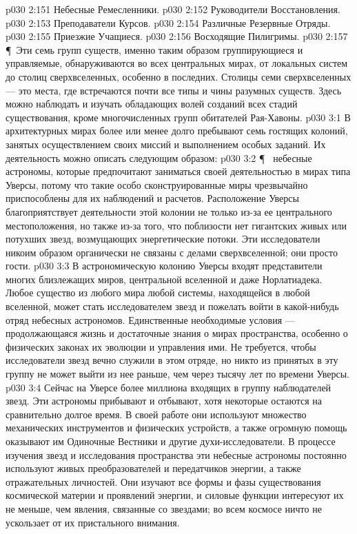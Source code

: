 \vs p030 2:151 \bibnobreakspace Небесные Ремесленники.
\vs p030 2:152 \bibnobreakspace Руководители Восстановления.
\vs p030 2:153 \bibnobreakspace Преподаватели Курсов.
\vs p030 2:154 \bibnobreakspace Различные Резервные Отряды.
\vs p030 2:155 \bibnobreakspace Приезжие Учащиеся.
\vs p030 2:156 \bibnobreakspace Восходящие Пилигримы.
\vs p030 2:157 \P\ Эти семь групп существ, именно таким образом группирующиеся и управляемые, обнаруживаются во всех центральных мирах, от локальных систем до столиц сверхвселенных, особенно в последних. Столицы семи сверхвселенных --- это места, где встречаются почти все типы и чины разумных существ. Здесь можно наблюдать и изучать обладающих волей созданий всех стадий существования, кроме многочисленных групп обитателей Рая\hyp{}Хавоны.
\vs p030 3:1 В архитектурных мирах более или менее долго пребывают семь гостящих колоний, занятых осуществлением своих миссий и выполнением особых заданий. Их деятельность можно описать следующим образом:
\vs p030 3:2 \P\ \bibnobreakspace {} небесные астрономы, которые предпочитают заниматься своей деятельностью в мирах типа Уверсы, потому что такие особо сконструированные миры чрезвычайно приспособлены для их наблюдений и расчетов. Расположение Уверсы благоприятствует деятельности этой колонии не только из\hyp{}за ее центрального местоположения, но также из\hyp{}за того, что поблизости нет гигантских живых или потухших звезд, возмущающих энергетические потоки. Эти исследователи никоим образом органически не связаны с делами сверхвселенной; они просто гости.
\vs p030 3:3 В астрономическую колонию Уверсы входят представители многих близлежащих миров, центральной вселенной и даже Норлатиадека. Любое существо из любого мира любой системы, находящейся в любой вселенной, может стать исследователем звезд и пожелать войти в какой\hyp{}нибудь отряд небесных астрономов. Единственные необходимые условия --- продолжающаяся жизнь и достаточные знания о мирах пространства, особенно о физических законах их эволюции и управления ими. Не требуется, чтобы исследователи звезд вечно служили в этом отряде, но никто из принятых в эту группу не может выйти из нее раньше, чем через тысячу лет по времени Уверсы.
\vs p030 3:4 Сейчас на Уверсе более миллиона входящих в группу наблюдателей звезд. Эти астрономы прибывают и отбывают, хотя некоторые остаются на сравнительно долгое время. В своей работе они используют множество механических инструментов и физических устройств, а также огромную помощь оказывают им Одиночные Вестники и другие духи\hyp{}исследователи. В процессе изучения звезд и исследования пространства эти небесные астрономы постоянно используют живых преобразователей и передатчиков энергии, а также отражательных личностей. Они изучают все формы и фазы существования космической материи и проявлений энергии, и силовые функции интересуют их не меньше, чем явления, связанные со звездами; во всем космосе ничто не ускользает от их пристального внимания.
